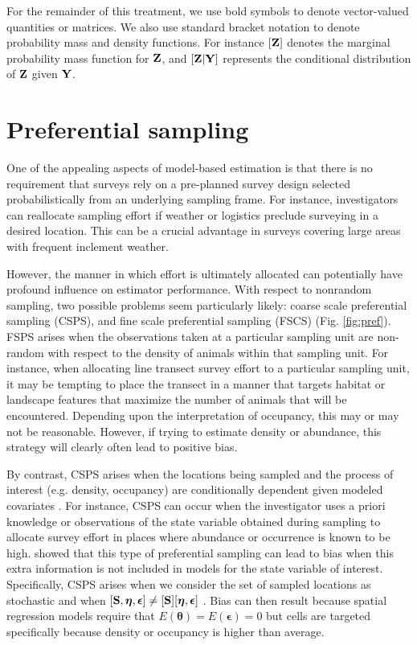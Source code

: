 \documentclass[fleqn,10pt]{wlpeerj}
\begin{document}
For the remainder of this treatment, we use bold symbols to denote vector-valued quantities or matrices.  We also use standard bracket notation to denote probability mass and density functions.  For instance $[{\bf Z}]$ denotes the marginal probability mass function for ${\bf Z}$, and  $[{\bf Z}|{\bf Y}]$ represents the conditional distribution of ${\bf Z}$ given ${\bf Y}$.

\section*{Preferential sampling}

One of the appealing aspects of model-based estimation is that there is no requirement that surveys rely on a pre-planned survey design selected probabilistically from an underlying sampling frame.  For instance, investigators can reallocate sampling effort if weather or logistics preclude surveying in a desired location.  This can be a crucial advantage in surveys covering large areas with frequent inclement weather.  

However, the manner in which effort is ultimately allocated can potentially have profound influence on estimator performance.  With respect to nonrandom sampling, two possible problems seem particularly likely: coarse scale preferential sampling (CSPS), and fine scale preferential sampling (FSCS) (Fig. \ref{fig:pref}).  FSPS arises when the observations taken at a  particular sampling unit are non-random with respect to the density of animals within that sampling unit.  For instance, when allocating line transect survey effort to a particular sampling unit, it may be tempting to place the transect in a manner that targets habitat or landscape features that maximize the number of animals that will be encountered.  Depending upon the interpretation of occupancy, this may or may not be reasonable.  However, if trying to estimate density or abundance, this strategy will clearly often lead to positive bias.

By contrast, CSPS arises when the locations being sampled and the process of interest (e.g. density, occupancy) are conditionally dependent given modeled covariates \citep{DiggleEtAl2010}.  For instance, CSPS can occur when the investigator uses a priori knowledge or observations of the state variable obtained during sampling to allocate survey effort in places where abundance or occurrence is known to be high. \citet{DiggleEtAl2010} showed that this type of preferential sampling can lead to bias when this extra information is not included in models for the state variable of interest.  Specifically, CSPS arises when we consider the set of sampled locations as stochastic and when $[{\bf S},\boldsymbol{\eta},\boldsymbol{\epsilon}] \neq [{\bf S}][\boldsymbol{\eta},\boldsymbol{\epsilon}]$ \citep{DiggleEtAl2010}.  Bias can then result because spatial regression models require that $E(\boldsymbol{\theta})=E(\boldsymbol{\epsilon})=0$ but cells are targeted specifically because density or occupancy is higher than average.  
\end{document}
